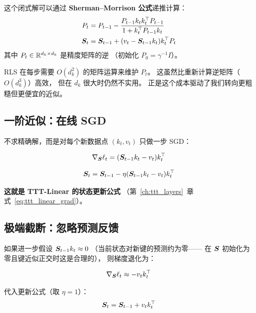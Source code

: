 这个闭式解可以通过 \textbf{Sherman–Morrison 公式}递推计算：
\begin{align}
  P_t &= P_{t-1} - \frac{P_{t-1} k_t k_t^\top P_{t-1}}{1 + k_t^\top P_{t-1} k_t}
  \label{eq:rls_P} \\
  \boldsymbol{S}_t &= \boldsymbol{S}_{t-1} + (v_t - \boldsymbol{S}_{t-1} k_t) k_t^\top P_t
  \label{eq:rls_S}
\end{align}
其中 $P_t \in \mathbb{R}^{d_k \times d_k}$ 是精度矩阵的逆
（初始化 $P_0 = \gamma^{-1} I$）。

\begin{remark}
RLS 在每步需要 $O(d_k^2)$ 的矩阵运算来维护 $P_t$。
这虽然比重新计算逆矩阵（$O(d_k^3)$）高效，
但在 $d_k$ 很大时仍然不实用。
正是这个成本驱动了我们转向更粗糙但更便宜的近似。
\end{remark}

\subsection{一阶近似：在线 SGD}

不求精确解，而是对每个新数据点 $(k_t, v_t)$ 只做一步 SGD：

\begin{equation}
  \nabla_{\boldsymbol{S}} \ell_t = (\boldsymbol{S}_{t-1} k_t - v_t) k_t^\top
\end{equation}

\begin{equation}
  \boldsymbol{S}_t = \boldsymbol{S}_{t-1} - \eta (\boldsymbol{S}_{t-1} k_t - v_t) k_t^\top
  \label{eq:ttr_sgd}
\end{equation}

\textbf{这就是 TTT-Linear 的状态更新公式}
（第~\ref{ch:ttt_layers}~章式~\eqref{eq:ttt_linear_grad}）。

\subsection{极端截断：忽略预测反馈}

如果进一步假设 $\boldsymbol{S}_{t-1} k_t \approx 0$
（当前状态对新键的预测约为零——
在 $\boldsymbol{S}$ 初始化为零且键近似正交时这是合理的），
则梯度退化为：

\begin{equation}
  \nabla_{\boldsymbol{S}} \ell_t \approx -v_t k_t^\top
\end{equation}

代入更新公式（取 $\eta = 1$）：
\begin{equation}
  \boldsymbol{S}_t = \boldsymbol{S}_{t-1} + v_t k_t^\top
  \label{eq:ttr_degenerate}
\end{equation}

